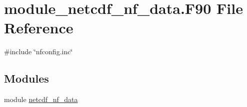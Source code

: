 \hypertarget{module__netcdf__nf__data_8F90}{}\section{module\+\_\+netcdf\+\_\+nf\+\_\+data.\+F90 File Reference}
\label{module__netcdf__nf__data_8F90}
{\ttfamily \#include \char`\"{}nfconfig.\+inc\char`\"{}}\newline
\subsection*{Modules}
\begin{DoxyCompactItemize}
\item 
module \hyperlink{namespacenetcdf__nf__data}{netcdf\+\_\+nf\+\_\+data}
\end{DoxyCompactItemize}
